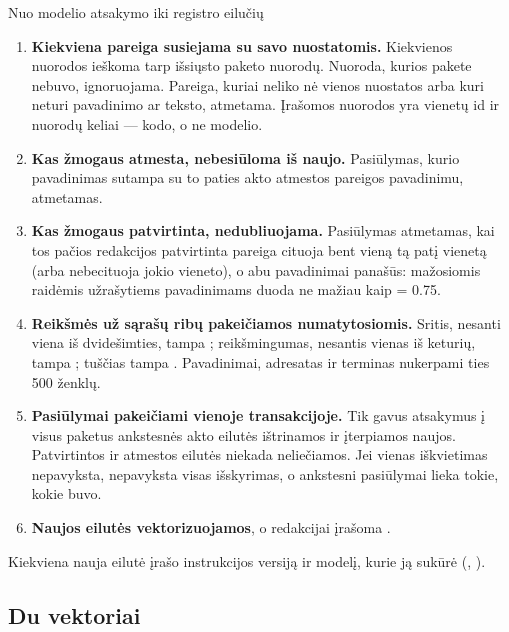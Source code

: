 \begin{codebox}{Nuo modelio atsakymo iki registro eilučių}
\begin{enumerate}
  \item \textbf{Kiekviena pareiga susiejama su savo nuostatomis.} Kiekvienos 
    nuorodos ieškoma tarp išsiųsto paketo nuorodų. Nuoroda, kurios pakete nebuvo, ignoruojama.
    Pareiga, kuriai neliko nė vienos nuostatos arba kuri neturi pavadinimo ar teksto, atmetama.
    Įrašomos nuorodos yra vienetų id ir nuorodų keliai --- kodo, o ne modelio.
  \item \textbf{Kas žmogaus atmesta, nebesiūloma iš naujo.} Pasiūlymas, kurio pavadinimas sutampa su to
    paties akto atmestos pareigos pavadinimu, atmetamas.
  \item \textbf{Kas žmogaus patvirtinta, nedubliuojama.} Pasiūlymas atmetamas, kai tos pačios
    redakcijos patvirtinta pareiga cituoja bent vieną tą patį vienetą (arba nebecituoja jokio
    vieneto), o abu pavadinimai panašūs:  mažosiomis raidėmis
    užrašytiems pavadinimams duoda ne mažiau kaip  = 0.75.
  \item \textbf{Reikšmės už sąrašų ribų pakeičiamos numatytosiomis.} Sritis, nesanti viena iš
    dvidešimties, tampa ; reikšmingumas, nesantis vienas iš keturių, tampa
    ; tuščias  tampa . Pavadinimai, adresatas ir terminas
    nukerpami ties 500 ženklų.
  \item \textbf{Pasiūlymai pakeičiami vienoje transakcijoje.} Tik gavus atsakymus į visus
    paketus ankstesnės akto  eilutės ištrinamos ir įterpiamos naujos. Patvirtintos ir
    atmestos eilutės niekada neliečiamos. Jei vienas iškvietimas nepavyksta, nepavyksta visas
    išskyrimas, o ankstesni pasiūlymai lieka tokie, kokie buvo.
  \item \textbf{Naujos eilutės vektorizuojamos}, o redakcijai įrašoma
    .
\end{enumerate}
Kiekviena nauja eilutė įrašo instrukcijos versiją ir modelį, kurie ją sukūrė
(, ).
\end{codebox}

\subsection{Du vektoriai}\label{sec:obligations:embeddings}


